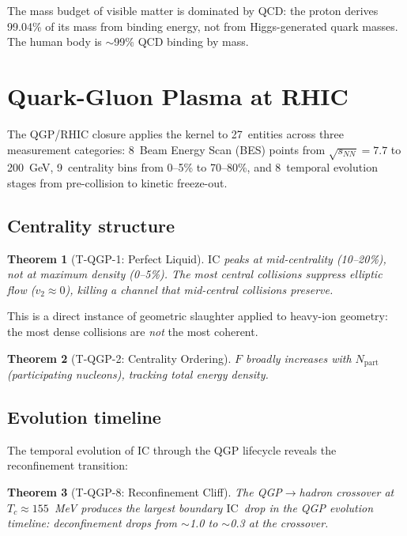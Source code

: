 \documentclass[
  aps,
  prd,
  twocolumn,
  superscriptaddress,
  nofootinbib,
  floatfix
]{revtex4-2}
\newtheorem{theorem}{Theorem}
\newcommand{\IC}{\mathrm{IC}}
\begin{document}
The mass budget of visible matter is dominated by QCD:
the proton derives 99.04\% of its mass from binding energy,
not from Higgs-generated quark masses.  The human body is
$\sim$99\% QCD binding by mass.

\section{Quark-Gluon Plasma at RHIC}\label{sec:qgp}

The QGP/RHIC closure applies the kernel to 27~entities across
three measurement categories: 8~Beam Energy Scan (BES) points
from $\sqrt{s_{NN}} = 7.7$ to 200~GeV, 9~centrality bins from
0--5\% to 70--80\%, and 8~temporal evolution stages from
pre-collision to kinetic freeze-out.

\subsection{Centrality structure}

\begin{theorem}[T-QGP-1: Perfect Liquid]
\label{thm:liquid}
$\IC$ peaks at mid-centrality (10--20\%), not at maximum
density (0--5\%).  The most central collisions suppress
elliptic flow ($v_2 \approx 0$), killing a channel that
mid-central collisions preserve.
\end{theorem}

This is a direct instance of geometric slaughter applied
to heavy-ion geometry: the most dense collisions are \emph{not}
the most coherent.

\begin{theorem}[T-QGP-2: Centrality Ordering]
\label{thm:centorder}
$F$ broadly increases with $N_{\text{part}}$ (participating
nucleons), tracking total energy density.
\end{theorem}

\subsection{Evolution timeline}

The temporal evolution of $\IC$ through the QGP lifecycle
reveals the reconfinement transition:

\begin{theorem}[T-QGP-8: Reconfinement Cliff]
\label{thm:reconf}
The QGP$\to$hadron crossover at $T_c \approx 155$~MeV
produces the largest boundary $\IC$~drop in the QGP
evolution timeline: deconfinement drops from $\sim$1.0
to $\sim$0.3 at the crossover.
\end{theorem}
\end{document}

